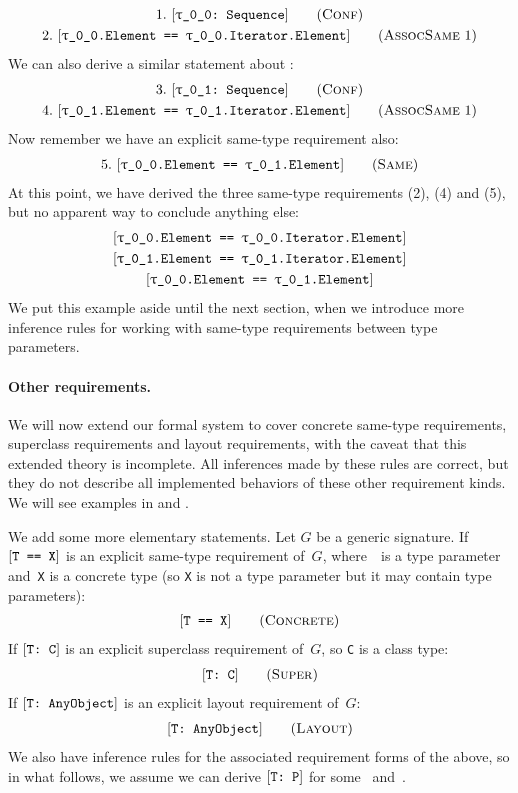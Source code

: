 \documentclass[../generics]{subfiles}
\begin{document}
\begin{example}
\begin{gather*}
\ConfStep{\rT}{Sequence}{1}\\
\AssocSameStep{1}{\rT.Element}{\rT.Iterator.Element}{2}
\end{gather*}
We can also derive a similar statement about \rU:
\begin{gather*}
\ConfStep{\rU}{Sequence}{3}\\
\AssocSameStep{1}{\rU.Element}{\rU.Iterator.Element}{4}
\end{gather*}
Now remember we have an explicit same-type requirement also:
\begin{gather*}
\SameStep{\rT.Element}{\rU.Element}{5}
\end{gather*}
At this point, we have derived the three same-type requirements (2), (4) and (5), but no apparent way to conclude anything else:
\begin{gather*}
\SameReq{\rT.Element}{\rT.Iterator.Element}\\
\SameReq{\rU.Element}{\rU.Iterator.Element}\\
\SameReq{\rT.Element}{\rU.Element}
\end{gather*}
We put this example aside until the next section, when we introduce more inference rules for working with same-type requirements between type parameters.
\end{example}

\paragraph{Other requirements.}
We will now extend our formal system to cover concrete same-type requirements, superclass requirements and layout requirements, with the caveat that this extended theory is incomplete. All inferences made by these rules are correct, but they do not describe all implemented behaviors of these other requirement kinds. We will see examples in  and .

We add some more elementary statements. Let $G$ be a generic signature. If $[\texttt{T == X}]$ is an explicit same-type requirement of~$G$, where~\tT\ is a type parameter and~\texttt{X} is a concrete type (so \texttt{X} is not a type parameter but it may contain type parameters):
\begin{gather*}
\ConcreteStepDef
\end{gather*}
If $[\texttt{T:~C}]$ is an explicit superclass requirement of~$G$, so \texttt{C} is a class type:
\begin{gather*}
\SuperStepDef
\end{gather*}
If $[\texttt{T:~AnyObject}]$ is an explicit layout requirement of~$G$:
\begin{gather*}
\LayoutStepDef
\end{gather*}
We also have inference rules for the associated requirement forms of the above, so in what follows, we assume we can derive $[\texttt{T:~P}]$ for some \tT~and~\tP.
\end{document}
